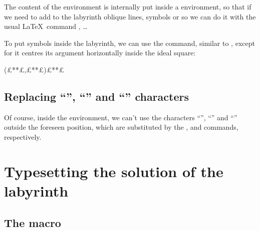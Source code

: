 \documentclass[a4paper,11pt,headinclude,footinclude]{scrartcl}
\begin{document}
The content of the  environment is internally put inside a  environment, so that if we need to add to the labyrinth oblique lines, symbols or so we can do it with the usual \LaTeX\ command , \dots

To put symbols inside the labyrinth, we can use the  command, similar to , except for it centres its argument horizontally inside the ideal square:
\begin{code}
\putsymbol(£**£,£**£){£**£}
\end{code}
%

\subsection{Replacing “\othname{+}”, “\othname{-}” and “\othname{*}” characters}

Of course, inside the  environment, we can't use the characters “\othname{+}”, “\othname{-}” and “\othname{*}” outside the foreseen position, which are substituted by the ,  and  commands, respectively.

\section{Typesetting the solution of the labyrinth}

\subsection{The  macro}
\end{document}
